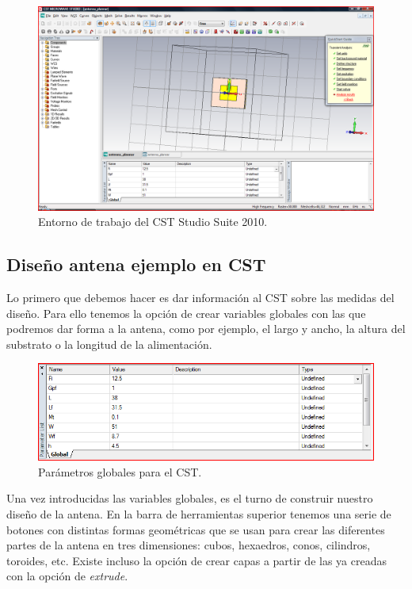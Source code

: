 \begin{figure}[!htb]
    \centering
    \includegraphics[scale=0.35]{./Metodologia/CST_first_window}
    \caption{Entorno de trabajo del CST Studio Suite 2010.}
    \label{fig:fig4.3}
\end{figure}

\subsection{Diseño antena ejemplo en CST}\label{subsec:diseno-antena-ejemplo-en-cst}

Lo primero que debemos hacer es dar información al CST sobre las medidas del diseño. Para ello tenemos la opción de crear variables globales con las que podremos dar forma a la antena, como por ejemplo, el largo y ancho, la altura del substrato o la longitud de la alimentación.

\clearpage

\begin{figure}[!htb]
    \centering
    \includegraphics[scale=0.4]{./Metodologia/CST_global_parametres}
    \caption{Parámetros globales para el CST.}
    \label{fig:fig4.4}
\end{figure}

Una vez introducidas las variables globales, es el turno de construir nuestro diseño de la antena. En la barra de herramientas superior tenemos una serie de botones con distintas formas geométricas que se usan para crear las diferentes partes de la antena en tres dimensiones: cubos, hexaedros, conos, cilindros, toroides, etc. Existe incluso la opción de crear capas a partir de las ya creadas con la opción de \textit{extrude}.

